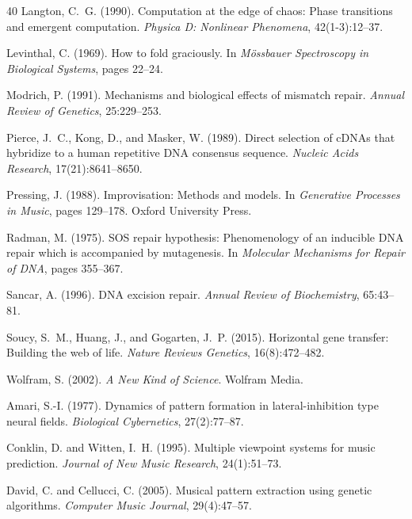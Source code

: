 \documentclass[11pt,a4paper]{article}
\begin{document}
\begin{thebibliography}{40}
Langton, C.~G. (1990).
\newblock Computation at the edge of chaos: Phase transitions and emergent computation.
\newblock \emph{Physica D: Nonlinear Phenomena}, 42(1-3):12--37.

Levinthal, C. (1969).
\newblock How to fold graciously.
\newblock In \emph{M\"ossbauer Spectroscopy in Biological Systems}, pages 22--24.

Modrich, P. (1991).
\newblock Mechanisms and biological effects of mismatch repair.
\newblock \emph{Annual Review of Genetics}, 25:229--253.

Pierce, J.~C., Kong, D., and Masker, W. (1989).
\newblock Direct selection of cDNAs that hybridize to a human repetitive DNA consensus sequence.
\newblock \emph{Nucleic Acids Research}, 17(21):8641--8650.

Pressing, J. (1988).
\newblock Improvisation: Methods and models.
\newblock In \emph{Generative Processes in Music}, pages 129--178. Oxford University Press.

Radman, M. (1975).
\newblock SOS repair hypothesis: Phenomenology of an inducible DNA repair which is accompanied by mutagenesis.
\newblock In \emph{Molecular Mechanisms for Repair of DNA}, pages 355--367.

Sancar, A. (1996).
\newblock DNA excision repair.
\newblock \emph{Annual Review of Biochemistry}, 65:43--81.

Soucy, S.~M., Huang, J., and Gogarten, J.~P. (2015).
\newblock Horizontal gene transfer: Building the web of life.
\newblock \emph{Nature Reviews Genetics}, 16(8):472--482.

Wolfram, S. (2002).
\newblock \emph{A New Kind of Science}.
\newblock Wolfram Media.

Amari, S.-I. (1977).
\newblock Dynamics of pattern formation in lateral-inhibition type neural fields.
\newblock \emph{Biological Cybernetics}, 27(2):77--87.

Conklin, D. and Witten, I.~H. (1995).
\newblock Multiple viewpoint systems for music prediction.
\newblock \emph{Journal of New Music Research}, 24(1):51--73.

David, C. and Cellucci, C. (2005).
\newblock Musical pattern extraction using genetic algorithms.
\newblock \emph{Computer Music Journal}, 29(4):47--57.


\end{thebibliography}
\end{document}
